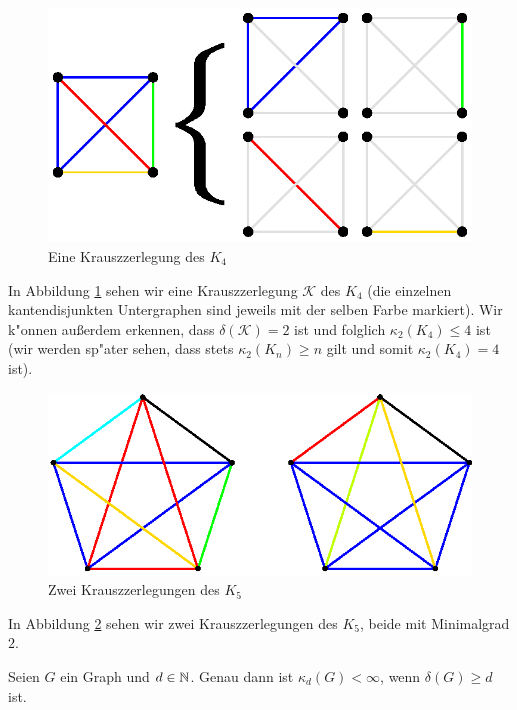 \begin{figure}[htb]
  \centering
  \includegraphics{images/k4decomp.eps}
  \caption{Eine Krauszzerlegung des $K_4$}
  \label{fig:KrauszzerlegungK4}
\end{figure}
In Abbildung \ref{fig:KrauszzerlegungK4} sehen wir eine Krauszzerlegung $\mathcal{K}$ des $K_4$ (die einzelnen kantendisjunkten Untergraphen sind jeweils mit der selben Farbe markiert). Wir k"onnen au{\ss}erdem erkennen, dass $\delta(\mathcal{K}) = 2$ ist und folglich $\kappa_{2}(K_4) \leq 4$ ist (wir werden sp"ater sehen, dass stets $\kappa_{2}(K_n) \geq n$ gilt und somit $\kappa_{2}(K_{4}) = 4$ ist).  
\begin{figure}[htb]
  \centering
  \includegraphics{images/K5krauszdecomp.eps}
  \caption{Zwei Krauszzerlegungen des $K_5$}
  \label{fig:KrauszzerlegungK5}
\end{figure} 
In Abbildung \ref{fig:KrauszzerlegungK5} sehen wir zwei Krauszzerlegungen des $K_5$, beide mit Minimalgrad $2$. 

\begin{lemma}
  Seien $G$ ein Graph und $d\in {\mathbb{N}}$. Genau dann ist $\kappa_{d}(G) < \infty$, wenn $\delta(G) \geq d$ ist. 
  \label{lm:krauszexistenz}
\end{lemma}

